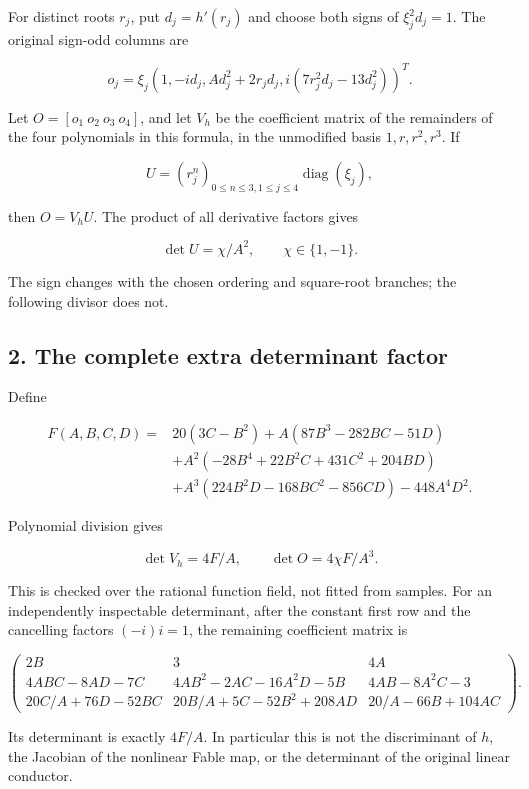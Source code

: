 For distinct roots \(r_j\), put \(d_j=h'(r_j)\) and choose both signs of
\(\xi_j^2d_j=1\). The original sign-odd columns are

\[
 o_j=\xi_j(1,-id_j,Ad_j^2+2r_jd_j,
                i(7r_j^2d_j-13d_j^2))^T.
\]

Let \(O=[o_1\ o_2\ o_3\ o_4]\), and let \(V_h\) be the coefficient
matrix of the remainders of the four polynomials in this formula, in the
unmodified basis \(1,r,r^2,r^3\). If

\[
 U=(r_j^n)_{0\le n\le3,1\le j\le4}\operatorname{diag}(\xi_j),
\]

then \(O=V_hU\). The product of all derivative factors gives

\[
 \det U=\chi/A^2,\qquad \chi\in\{1,-1\}.
\]

The sign changes with the chosen ordering and square-root branches; the
following divisor does not.

\subsection{2. The complete extra determinant
factor}\label{the-complete-extra-determinant-factor}

Define

\[
\begin{aligned}
 F(A,B,C,D)={}&20(3C-B^2)+A(87B^3-282BC-51D)\\
 &+A^2(-28B^4+22B^2C+431C^2+204BD)\\
 &+A^3(224B^2D-168BC^2-856CD)-448A^4D^2.
\end{aligned}
\]

Polynomial division gives

\[
 \det V_h=4F/A,\qquad \boxed{\det O=4\chi F/A^3.}
\]

This is checked over the rational function field, not fitted from
samples. For an independently inspectable determinant, after the
constant first row and the cancelling factors \((-i)i=1\), the remaining
coefficient matrix is

\[
\begin{pmatrix}
2B&3&4A\\
4ABC-8AD-7C&4AB^2-2AC-16A^2D-5B&4AB-8A^2C-3\\
20C/A+76D-52BC&20B/A+5C-52B^2+208AD&20/A-66B+104AC
\end{pmatrix}.
\]

Its determinant is exactly \(4F/A\). In particular this is not the
discriminant of \(h\), the Jacobian of the nonlinear Fable map, or the
determinant of the original linear conductor.

